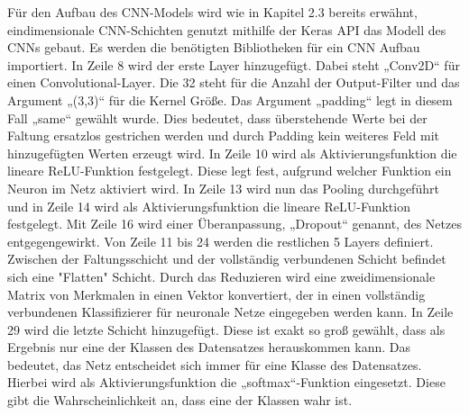 \documentclass[a4paper,11pt]{article}
\theoremstyle{mytheor}
\begin{document}
Für den Aufbau des CNN-Models wird wie in Kapitel 2.3 bereits erwähnt, eindimensionale CNN-Schichten genutzt mithilfe der Keras API das Modell des CNNs gebaut. Es werden die benötigten Bibliotheken für ein CNN Aufbau importiert. In Zeile 8 wird der erste Layer hinzugefügt. Dabei steht „Conv2D“ für einen Convolutional-Layer. Die 32 steht für die Anzahl der Output-Filter und das Argument „(3,3)“ für die Kernel Größe. Das Argument „padding“ legt in diesem Fall „same“ gewählt wurde. Dies bedeutet, dass überstehende Werte bei der Faltung ersatzlos gestrichen werden und durch Padding kein weiteres Feld
mit hinzugefügten Werten erzeugt wird. In Zeile 10 wird als
Aktivierungsfunktion die lineare ReLU-Funktion festgelegt. Diese legt fest, aufgrund welcher Funktion ein Neuron im Netz aktiviert wird. In Zeile 13 wird nun das Pooling durchgeführt und in Zeile 14 wird als Aktivierungsfunktion die lineare ReLU-Funktion festgelegt. Mit Zeile 16 wird einer Überanpassung, „Dropout“ genannt, des Netzes entgegengewirkt. Von Zeile 11 bis 24 werden die restlichen 5 Layers definiert. Zwischen der Faltungsschicht und der vollständig verbundenen Schicht befindet sich eine "Flatten" Schicht. Durch das Reduzieren wird eine zweidimensionale Matrix von Merkmalen in einen Vektor konvertiert, der in einen vollständig verbundenen Klassifizierer für neuronale Netze eingegeben werden kann. In Zeile 29 wird die letzte Schicht hinzugefügt. Diese ist exakt so
groß gewählt, dass als Ergebnis nur eine der Klassen des Datensatzes herauskommen kann. Das bedeutet, das Netz entscheidet sich immer für eine Klasse des Datensatzes. Hierbei wird als Aktivierungsfunktion die „softmax“-Funktion eingesetzt. Diese gibt die Wahrscheinlichkeit an, dass eine der Klassen wahr ist.
\end{document}
